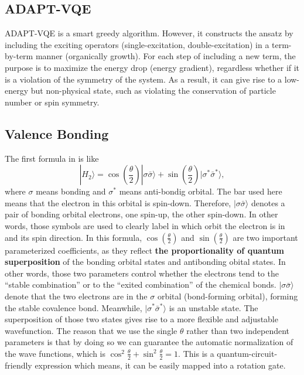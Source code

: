 \subsection{ADAPT-VQE}
ADAPT-VQE  is a smart greedy algorithm. However, it constructs the ansatz by including the exciting operators (single-excitation, double-excitation) in a term-by-term manner (organically growth). For each step of including a new term, the purpose is to maximize the energy drop (energy gradient), regardless whether if it is a violation of the symmetry of the system. As a result, it can give rise to a low-energy but non-physical state, such as violating the conservation of particle number or spin symmetry.
\subsection{Valence Bonding}
The first formula in \cite{UnbChemistry} is like
\begin{equation}
     |H_2\rangle= \cos(\frac{\theta}{2})|\sigma\bar{\sigma}\rangle+\sin(\frac{\theta}{2})|\sigma^*\bar{\sigma}^*\rangle, 
     \label{valenceBonding}
\end{equation}
where $\sigma $ means bonding and $\sigma^*$ means anti-bondig orbital. The bar used here means that the electron in this orbital is spin-down. Therefore, $|\sigma\bar{\sigma}\rangle$ denotes a pair of bonding orbital electrons, one spin-up, the other spin-down. In other words, those symbols are used to clearly label in which orbit the electron is in and its spin direction. 
In this formula, $\cos(\frac{\theta}{2})$ and $\sin(\frac{\theta}{2})$ are two important parameterized coefficients, as they reflect \textbf{the proportionality of quantum superposition} of the bonding orbital states and antibonding obital states. In other words, those two parameters control whether the electrons tend to the ``stable combination'' or to the ``exited combination'' of the chemical bonds. $|\sigma\bar{\sigma}\rangle$ denote that the two electrons are in the $\sigma$ orbital (bond-forming orbital), forming the stable covalence bond. Meanwhile, $|\sigma^*\bar{\sigma}^*\rangle$ is an unstable state. The superposition of those two states gives rise to a more flexible and adjustable wavefunction. The reason that we use the single $\theta$ rather than two independent parameters is that by doing so we can guarantee the automatic normalization of the wave functions, which is $\cos^2\frac{\theta}{2}+\sin^2\frac{\theta}{2}=1$. This is a quantum-circuit-friendly expression which means, it can be easily mapped into a rotation gate.

